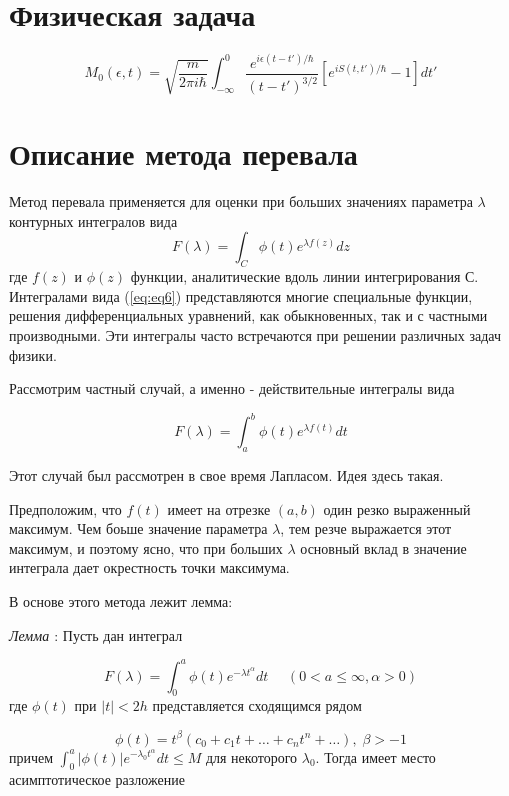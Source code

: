 \documentclass[14pt]{extarticle}
\begin{document}
\section{Физическая задача}

\begin{equation}\label{eq:input}
M_0(\epsilon, t) = \sqrt{\frac{m}{2\pi i \hbar}}\int_{-\infty}^{0} \frac{e^{i \epsilon (t - t')/\hbar}}{(t - t')^{3/2}} [e^{i S(t,t')/\hbar} - 1]dt'
\end{equation} 

\section{Описание метода перевала} 

Метод перевала применяется для оценки при больших значениях параметра $\lambda$ контурных интегралов вида
\begin{equation}\label{eq:eq6}
F(\lambda) = \int_{C}^{}\phi(t)e^{\lambda f(z)}dz
\end{equation} 
где $f(z)$ и $\phi(z)$ функции, аналитические вдоль линии интегрирования С. Интегралами вида (\ref{eq:eq6}) представляются многие специальные функции, решения дифференциальных уравнений, как обыкновенных, так и с частными производными. Эти интегралы часто встречаются при решении различных задач физики.

Рассмотрим частный случай, а именно - действительные интегралы вида

\begin{equation}\label{eq:eq7}
F(\lambda) = \int_{a}^{b}\phi(t)e^{\lambda f(t)}dt
\end{equation} 

Этот случай был рассмотрен в свое время Лапласом. Идея здесь такая. 

Предположим, что $f(t)$ имеет на отрезке $(a, b)$ один резко выраженный максимум. Чем боьше значение параметра $\lambda$, тем резче выражается этот максимум, и поэтому ясно, что при больших $\lambda$ основный вклад в значение интеграла дает окрестность точки максимума. 

В основе этого метода лежит лемма:

\textit{Лемма \label{lemma:lemma1}}: Пусть дан интеграл

$$
F(\lambda) = \int_{0}^{a}\phi(t)e^{-\lambda t^\alpha}dt \:\:\:\:\:\: (0 < a \le \infty, \alpha>0)
$$
где $\phi(t)$ при $|t|<2h$ представляется сходящимся рядом

$$
\phi(t)=t^\beta(c_0+c_1 t+\dots+c_n t^n+\dots), \; \beta>-1
$$
причем $\int_{0}^{a}|\phi(t)| e^{-\lambda_0 t^\alpha}dt\le M$ для некоторого $\lambda_0$. Тогда имеет место асимптотическое разложение
\end{document}
